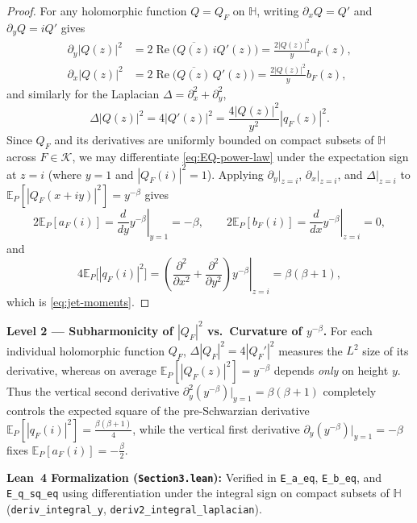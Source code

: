 \documentclass[12pt]{article}
\def\H{\mathbb{H}}
\def\K{\mathcal{K}}
\def\E{\mathbb{E}}
\theoremstyle{definition}
\numberwithin{equation}{section}
\begin{document}
\begin{proof}
For any holomorphic function $Q = Q_F$ on $\H$, writing $\partial_x Q = Q'$ and $\partial_y Q = i Q'$ gives
\[
\begin{aligned}
  \partial_y |Q(z)|^2 &= 2 \operatorname{Re}\!\big(\overline{Q(z)}\, i Q'(z)\big) = \frac{2 |Q(z)|^2}{y} a_F(z), \\
  \partial_x |Q(z)|^2 &= 2 \operatorname{Re}\!\big(\overline{Q(z)}\, Q'(z)\big) = \frac{2 |Q(z)|^2}{y} b_F(z),
\end{aligned}
\]
and similarly for the Laplacian $\Delta = \partial_x^2 + \partial_y^2$,
\[
  \Delta |Q(z)|^2 = 4 |Q'(z)|^2 = \frac{4 |Q(z)|^2}{y^2} |q_F(z)|^2.
\]
Since $Q_F$ and its derivatives are uniformly bounded on compact subsets of $\H$ across $F \in \K$, we may differentiate \eqref{eq:EQ-power-law} under the expectation sign at $z = i$ (where $y = 1$ and $|Q_F(i)|^2 = 1$). Applying $\partial_y|_{z=i}$, $\partial_x|_{z=i}$, and $\Delta|_{z=i}$ to $\E_P[|Q_F(x+iy)|^2] = y^{-\beta}$ gives
\[
  2 \E_P[a_F(i)] = \left.\frac{d}{dy} y^{-\beta}\right|_{y=1} = -\beta, \qquad 2 \E_P[b_F(i)] = \left.\frac{d}{dx} y^{-\beta}\right|_{z=i} = 0,
\]
and
\[
  4 \E_P\Big[|q_F(i)|^2\Big] = \left.\left(\frac{\partial^2}{\partial x^2} + \frac{\partial^2}{\partial y^2}\right) y^{-\beta}\right|_{z=i} = \beta(\beta + 1),
\]
which is \eqref{eq:jet-moments}.
\end{proof}

\begin{leveltwo}
\noindent\textbf{\textcolor{l2border}{Level 2 --- Subharmonicity of $|Q_F|^2$ vs.\ Curvature of $y^{-\beta}$.}}
For each individual holomorphic function $Q_F$, $\Delta |Q_F|^2 = 4|Q_F'|^2$ measures the $L^2$ size of its derivative, whereas on average $\E_P[|Q_F(z)|^2] = y^{-\beta}$ depends \emph{only} on height $y$. Thus the vertical second derivative $\partial_y^2(y^{-\beta})|_{y=1} = \beta(\beta+1)$ completely controls the expected square of the pre-Schwarzian derivative $\E_P[|q_F(i)|^2] = \frac{\beta(\beta+1)}{4}$, while the vertical first derivative $\partial_y(y^{-\beta})|_{y=1} = -\beta$ fixes $\E_P[a_F(i)] = -\frac{\beta}{2}$.

\smallskip
\noindent\textbf{\textcolor{leannote}{Lean~4 Formalization (\texttt{Section3.lean}):}} Verified in \texttt{E\_a\_eq}, \texttt{E\_b\_eq}, and \texttt{E\_q\_sq\_eq} using differentiation under the integral sign on compact subsets of $\H$ (\texttt{deriv\_integral\_y}, \texttt{deriv2\_integral\_laplacian}).
\end{leveltwo}
\end{document}
